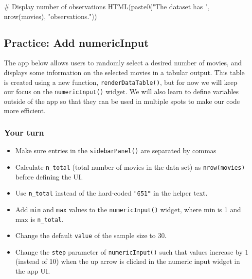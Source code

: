 \documentclass[
  letterpaper,
  DIV=11,
  numbers=noendperiod]{scrreprt}
\newenvironment{Shaded}{\begin{snugshade}}{\end{snugshade}}
\newcommand{\CommentTok}[1]{\textcolor[rgb]{0.37,0.37,0.37}{#1}}
\newcommand{\FunctionTok}[1]{\textcolor[rgb]{0.28,0.35,0.67}{#1}}
\newcommand{\NormalTok}[1]{\textcolor[rgb]{0.00,0.46,0.62}{#1}}
\newcommand{\StringTok}[1]{\textcolor[rgb]{0.13,0.47,0.30}{#1}}
\begin{document}
\begin{Shaded}
\begin{Highlighting}[]
\CommentTok{\# Display number of observations}
\FunctionTok{HTML}\NormalTok{(}\FunctionTok{paste0}\NormalTok{(}\StringTok{"The dataset has "}\NormalTok{, }\FunctionTok{nrow}\NormalTok{(movies), }
            \StringTok{"observations."}\NormalTok{))}
\end{Highlighting}
\end{Shaded}

\hypertarget{practice-add-numericinput}{%
\subsection{Practice: Add
numericInput}\label{practice-add-numericinput}}

The app below allows users to randomly select a desired number of
movies, and displays some information on the selected movies in a
tabular output. This table is created using a new function,
\texttt{renderDataTable()}, but for now we will keep our focus on the
\texttt{numericInput()} widget. We will also learn to define variables
outside of the app so that they can be used in multiple spots to make
our code more efficient.

\hypertarget{your-turn-10}{%
\subsubsection{Your turn}\label{your-turn-10}}

\begin{itemize}
\item
  Make sure entries in the \texttt{sidebarPanel()} are separated by
  commas
\item
  Calculate \texttt{n\_total} (total number of movies in the data set)
  as \texttt{nrow(movies)} before defining the UI.
\item
  Use \texttt{n\_total} instead of the hard-coded \texttt{"651"} in the
  helper text.
\item
  Add \texttt{min} and \texttt{max} values to the
  \texttt{numericInput()} widget, where min is 1 and max is
  \texttt{n\_total}.
\item
  Change the default \texttt{value} of the sample size to 30.
\item
  Change the \texttt{step} parameter of \texttt{numericInput()} such
  that values increase by 1 (instead of 10) when the up arrow is clicked
  in the numeric input widget in the app UI.
\end{itemize}
\end{document}
